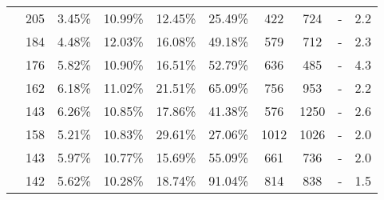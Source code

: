 \begin{table*}[h]
\begin{tabular}{@{}c c|c|c|c|c|c|c|c|c}
      &       205 &  3.45\% &  10.99\% &  12.45\% &  25.49\% &       422 &       724 &        - &        2.2 \\
      &       184 &  4.48\% &  12.03\% &  16.08\% &  49.18\% &       579 &       712 &        - &        2.3 \\
      &       176 &  5.82\% &  10.90\% &  16.51\% &  52.79\% &       636 &       485 &        - &        4.3 \\
      &       162 &  6.18\% &  11.02\% &  21.51\% &  65.09\% &       756 &       953 &        - &        2.2 \\
      &       143 &  6.26\% &  10.85\% &  17.86\% &  41.38\% &       576 &      1250 &        - &        2.6 \\
      &       158 &  5.21\% &  10.83\% &  29.61\% &  27.06\% &      1012 &      1026 &        - &        2.0 \\
      &       143 &  5.97\% &  10.77\% &  15.69\% &  55.09\% &       661 &       736 &        - &        2.0 \\
      &       142 &  5.62\% &  10.28\% &  18.74\% &  91.04\% &       814 &       838 &        - &        1.5 \\
     \hline
     \end{tabular}
    \label{tab:result_means}
\end{table*}